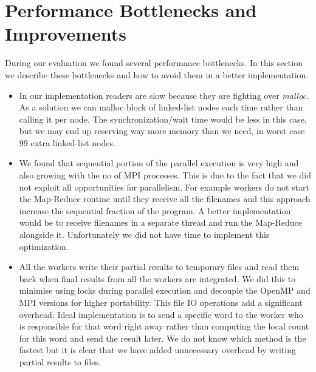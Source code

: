 \documentclass[12pt]{article}
\begin{document}
\section{Performance Bottlenecks and Improvements}
During our evaluation we found several performance bottlenecks. In this section we describe these bottlenecks and how to avoid them in a better implementation.
\begin{itemize}
    \item In our implementation readers are slow because they are fighting over {\em malloc}. As a solution we can malloc block of linked-list nodes each time rather than calling it per node. 
        The synchronization/wait time would be less in this case, but we may end up reserving way more memory than we need, in worst case 99 extra linked-list nodes. 
    \item We found that sequential portion of the parallel execution is very high and also growing with the no of MPI processes. This is due to the fact that we 
        did not exploit all opportunities for parallelism. For example workers do not start the Map-Reduce routine until they receive all the filenames and this
        approach increase the sequential fraction of the program. A better implementation would be to receive filenames in a separate thread and run the Map-Reduce
        alongside it. Unfortunately we did not have time to implement this optimization.
    \item All the workers write their partial results to temporary files and read them back when final results from all the workers are integrated. We did this
        to minimise using locks during parallel execution and decouple the OpenMP and MPI versions for higher portability. This file IO
        operations add a significant overhead. Ideal implementation is to send a specific word to the worker who is responsible for that word right away 
        rather than
        computing the local count for this word and send the result later. We do not know which method is the fastest but it is clear that we have added 
        unnecessary overhead by writing partial results to files.
\end{itemize}


\end{document}
